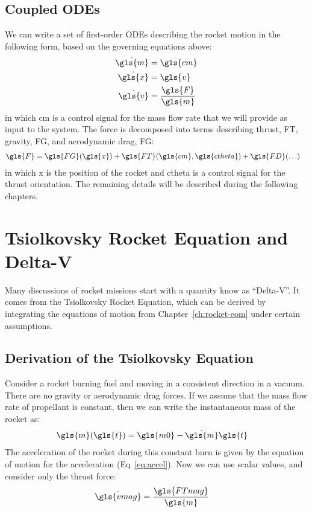 \documentclass[12pt,openany]{book}
\begin{document}
\section{Coupled ODEs}

We can write a set of first-order ODEs describing the rocket motion in the following form, based on the governing equations above:
\begin{align}
  \dot{\gls{m}} &= \gls{cm} \\
  \dot{\gls{x}} &= \gls{v} \\
  \dot{\gls{v}} &= \frac{\gls{F}}{\gls{m}} \label{eq:accel}
\end{align}
in which \gls{cm} is a control signal for the mass flow rate that we will provide as input to the system. The force is decomposed into terms describing thrust, \gls{FT}, gravity, \gls{FG}, and aerodynamic drag, \gls{FG}:
\begin{align}
  \gls{F} &= \gls{FG}(\gls{x})
  + \gls{FT}(\gls{cm},\gls{ctheta})
  + \gls{FD}(\ldots) 
\end{align}
in which \gls{x} is the position of the rocket and \gls{ctheta} is a control signal for the thrust orientation. The remaining details will be described during the following chapters.

\chapter{Tsiolkovsky Rocket Equation and Delta-V}

Many discussions of rocket missions start with a quantity know as ``Delta-V''. It comes from the Tsiolkovsky Rocket Equation, which can be derived by integrating the equations of motion from Chapter~\ref{ch:rocket-eom} under certain assumptions.

\section{Derivation of the Tsiolkovsky Equation}

Consider a rocket burning fuel and moving in a consistent direction in a vacuum. There are no gravity or aerodynamic drag forces. If we assume that the mass flow rate of propellant is constant, then we can write the instantaneous mass of the rocket as:
\begin{align}
  \gls{m}(\gls{t}) &= \gls{m0} - \dot{\gls{m}}\gls{t}
\end{align}
The acceleration of the rocket during this constant burn is given by the equation of motion for the acceleration (Eq~\ref{eq:accel}). Now we can use scalar values, and consider only the thrust force:
\begin{align}
  \dot{\gls{vmag}} &= \frac{\gls{FTmag}}{\gls{m}}
\end{align}

\printunsrtglossary[type=symbols,style=long]



\end{document}
